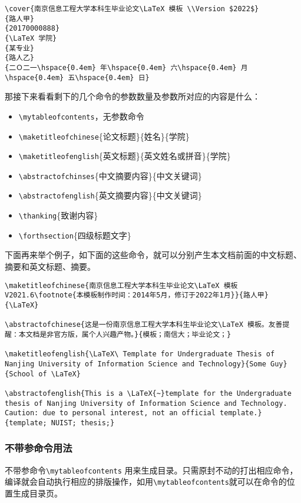 {
\color{green!50!black}
\begin{lstlisting}[breaklines=true,]
\cover{南京信息工程大学本科生毕业论文\LaTeX 模板 \\Version $2022$}
{路人甲}
{20170000888}
{\LaTeX 学院}
{某专业}
{路人乙}
{二Ｏ二一\hspace{0.4em} 年\hspace{0.4em} 六\hspace{0.4em} 月\hspace{0.4em} 五\hspace{0.4em} 日}
\end{lstlisting}
}

那接下来看看剩下的几个命令的参数数量及参数所对应的内容是什么：

{
\color{blue}
\begin{itemize}
    \item \verb|\mytableofcontents|，无参数命令
    \item \verb|\maketitleofchinese|\{论文标题\}\{姓名\}\{学院\}
    \item \verb|\maketitleofenglish|\{英文标题\}\{英文姓名或拼音\}\{学院\}
    \item \verb|\abstractofchinses|\{中文摘要内容\}\{中文关键词\}
    \item \verb|\abstractofenglish|\{英文摘要内容\}\{中文关键词\}
    \item \verb|\thanking|\{致谢内容\}
    \item \verb|\forthsection|\{四级标题文字\}
\end{itemize}
}

下面再来举个例子，如下面的这些命令，就可以分别产生本文档前面的中文标题、摘要和英文标题、摘要。

{
\color{green!50!black}
\begin{lstlisting}[breaklines=true,]
\maketitleofchinese{南京信息工程大学本科生毕业论文\LaTeX 模板V2021.6\footnote{本模板制作时间：2014年5月，修订于2022年1月}}{路人甲}{\LaTeX}

\abstractofchinese{这是一份南京信息工程大学本科生毕业论文\LaTeX 模板。友善提醒：本文档是非官方版，属个人兴趣产物。}{模板；南信大；毕业论文；}
    
\maketitleofenglish{\LaTeX\ Template for Undergraduate Thesis of Nanjing University of Information Science and Technology}{Some Guy}{School of \LaTeX}
    
\abstractofenglish{This is a \LaTeX{~}template for the Undergraduate thesis of Nanjing University of Information Science and Technology. Caution: due to personal interest, not an official template.}{template; NUIST; thesis;}
\end{lstlisting}
}

\subsubsection{不带参命令用法}

不带参命令\verb|\mytableofcontents| 用来生成目录。只需原封不动的打出相应命令，编译就会自动执行相应的排版操作，如用\verb|\mytableofcontents|就可以在命令的位置生成目录页。